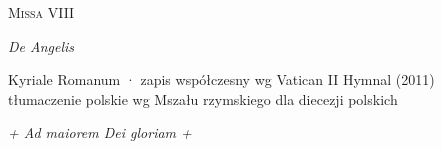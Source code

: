



\begin{center}
  {\Huge\scshape Missa VIII}\par\smallskip
  {\Large\itshape De Angelis}\par\smallskip
  {\small Kyriale Romanum · zapis współczesny wg Vatican II Hymnal (2011)\\
   tłumaczenie polskie wg Mszału rzymskiego dla diecezji polskich}
\end{center}







\vfill
{\centering\itshape + Ad maiorem Dei gloriam +\par}



